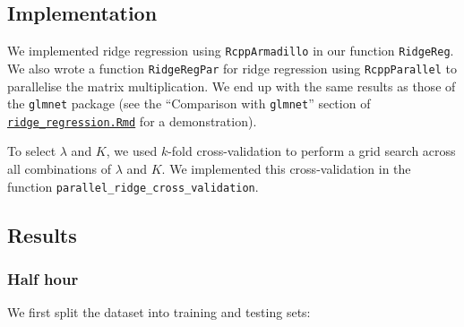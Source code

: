 \documentclass[
]{article}
\newenvironment{Shaded}{\begin{snugshade}}{\end{snugshade}}
\newcommand{\CommentTok}[1]{\textcolor[rgb]{0.56,0.35,0.01}{\textit{#1}}}
\newcommand{\DecValTok}[1]{\textcolor[rgb]{0.00,0.00,0.81}{#1}}
\newcommand{\FloatTok}[1]{\textcolor[rgb]{0.00,0.00,0.81}{#1}}
\newcommand{\FunctionTok}[1]{\textcolor[rgb]{0.13,0.29,0.53}{\textbf{#1}}}
\newcommand{\NormalTok}[1]{#1}
\newcommand{\OtherTok}[1]{\textcolor[rgb]{0.56,0.35,0.01}{#1}}
\newcommand{\SpecialCharTok}[1]{\textcolor[rgb]{0.81,0.36,0.00}{\textbf{#1}}}
\begin{document}
\hypertarget{implementation}{%
\subsection{Implementation}\label{implementation}}

We implemented ridge regression using \texttt{RcppArmadillo} in our
function \texttt{RidgeReg}. We also wrote a function
\texttt{RidgeRegPar} for ridge regression using \texttt{RcppParallel} to
parallelise the matrix multiplication. We end up with the same results
as those of the \texttt{glmnet} package (see the ``Comparison with
\texttt{glmnet}'' section of
\href{https://github.com/Shermjj/SC-2-Electric-Boogalo/blob/main-edit-cbm/notes/ridge_regression.Rmd}{\texttt{ridge\_regression.Rmd}}
for a demonstration).

To select \(\lambda\) and \(K\), we used \(k\)-fold cross-validation to
perform a grid search across all combinations of \(\lambda\) and \(K\).
We implemented this cross-validation in the function
\texttt{parallel\_ridge\_cross\_validation}.

\hypertarget{results}{%
\subsection{Results}\label{results}}

\hypertarget{half-hour}{%
\subsubsection{Half hour}\label{half-hour}}

We first split the dataset into training and testing sets:

\begin{Shaded}
\end{Shaded}
\end{document}
